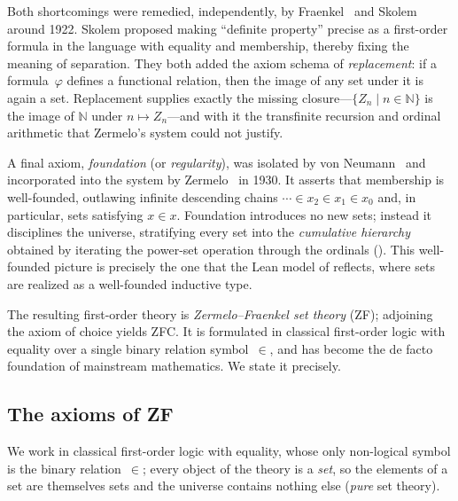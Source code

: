 Both shortcomings were remedied, independently, by
Fraenkel~\cite{fraenkel1922grundlagen} and Skolem~\cite{skolem1922bemerkungen}
around 1922. Skolem proposed making ``definite property'' precise as a
first-order formula in the language with equality and membership, thereby fixing
the meaning of separation. They both added the axiom schema of
\emph{replacement}: if a formula~$\varphi$ defines a functional relation, then
the image of any set under it is again a set. Replacement supplies exactly the
missing closure---$\{Z_n \mid n \in \mathbb{N}\}$ is the image of $\mathbb{N}$
under $n \mapsto Z_n$---and with it the transfinite recursion and ordinal
arithmetic that Zermelo's system could not justify.

A final axiom, \emph{foundation} (or \emph{regularity}), was isolated by von
Neumann~\cite{vonNeumann1925axiomatisierung} and incorporated into the system by
Zermelo~\cite{zermelo1930grenzzahlen} in 1930. It asserts that membership is
well-founded, outlawing infinite descending chains
$\cdots \in x_2 \in x_1 \in x_0$ and, in particular, sets satisfying $x \in x$.
Foundation introduces no new sets; instead it disciplines the universe,
stratifying every set into the \emph{cumulative hierarchy} obtained by iterating
the power-set operation through the ordinals ().
This well-founded picture is precisely the one that the Lean model of
 reflects, where sets are realized as a well-founded inductive
type.

The resulting first-order theory is \emph{Zermelo--Fraenkel set theory} (ZF);
adjoining the axiom of choice yields ZFC. It is formulated in classical
first-order logic with equality over a single binary relation symbol~$\in$, and
has become the de facto foundation of mainstream mathematics. We state it
precisely.

\subsection{The axioms of ZF}
\label{subsec:set-theory-axioms}

We work in classical first-order logic with equality, whose only non-logical
symbol is the binary relation~$\in$; every object of the theory is a \emph{set},
so the elements of a set are themselves sets and the universe contains nothing
else (\emph{pure} set theory).

